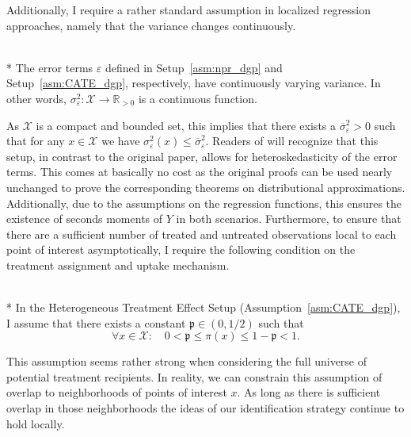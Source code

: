 Additionally, I require a rather standard assumption in localized regression approaches, namely that the variance changes continuously.
\begin{boxD}
	\begin{asm}\label{asm:errors}\mbox{}\\*
		The error terms $\varepsilon$ defined in Setup~\ref{asm:npr_dgp} and Setup~\ref{asm:CATE_dgp}, respectively, have continuously varying variance.
		In other words, $\sigma^2_{\varepsilon}: \mathcal{X} \rightarrow \mathbb{R}_{>0}$ is a continuous function.
	\end{asm}
\end{boxD}
As $\mathcal{X}$ is a compact and bounded set, this implies that there exists a $\overline{\sigma}_{\varepsilon}^2 > 0$ such that for any $x \in \mathcal{X}$ we have $\sigma^{2}_{\varepsilon}\left(x\right) \leq \overline{\sigma}_{\varepsilon}^2$.
Readers of \citet{demirkaya_optimal_2024} will recognize that this setup, in contrast to the original paper, allows for heteroskedasticity of the error terms.
This comes at basically no cost as the original proofs can be used nearly unchanged to prove the corresponding theorems on distributional approximations.
Additionally, due to the assumptions on the regression functions, this ensures the existence of seconds moments of $Y$ in both scenarios.
Furthermore, to ensure that there are a sufficient number of treated and untreated observations local to each point of interest asymptotically, I require the following condition on the treatment assignment and uptake mechanism.
\begin{boxD}
	\begin{asm}\label{asm:treatment_overlap}\mbox{}\\*
		In the Heterogeneous Treatment Effect Setup (Assumption~\ref{asm:CATE_dgp}), I assume that there exists a constant $\mathfrak{p} \in (0, 1/2)$ such that
		\begin{equation}
			\forall x \in \mathcal{X}: \quad 
			0 < \mathfrak{p} \leq \pi\left(x\right) \leq 1 - \mathfrak{p} < 1.
		\end{equation}
	\end{asm}
\end{boxD}
This assumption seems rather strong when considering the full universe of potential treatment recipients.
In reality, we can constrain this assumption of overlap to neighborhoods of points of interest $x$.
As long as there is sufficient overlap in those neighborhoods the ideas of our identification strategy continue to hold locally.

